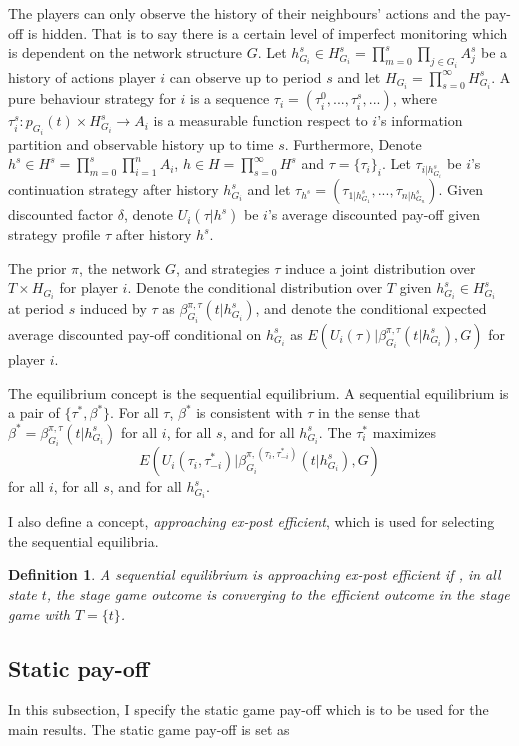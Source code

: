 \documentclass[12pt,letter]{article}
\newtheorem{definition}{Definition}[section]
\theoremstyle{remark}
\theoremstyle{remark}
\theoremstyle{claim}
\begin{document}
The players can only observe the history of their neighbours' actions and the pay-off is hidden. That is to say there is a certain level of imperfect monitoring which is dependent on the network structure $G$. Let $h^s_{G_i}\in H^s_{G_i}=\prod^s_{m=0}\prod_{j\in G_i}A^s_j$ be a history of actions player $i$ can observe up to period $s$ and let $H_{G_i}=\prod^{\infty}_{s=0}H^s_{G_i}$. A pure behaviour strategy for $i$ is a sequence $\tau_i=(\tau^0_i,...,\tau^s_i,...)$, where $\tau^s_i: p_{G_i}(t)\times H^s_{G_i}\rightarrow A_i$ is a measurable function respect to $i$'s information partition and observable history up to time $s$.  Furthermore, Denote $h^s\in H^s=\prod^s_{m=0}\prod^n_{i=1}A_i$, $h\in H=\prod^{\infty}_{s=0}H^s$ and $\tau=\{\tau_i\}_i$.  Let $\tau_{i|h^s_{G_i}}$ be $i$'s continuation strategy after history $h^s_{G_i}$ and let $\tau_{h^s}=(\tau_{1|h^s_{G_1}},...,\tau_{n|h^s_{G_n}})$. Given discounted factor $\delta$, denote $U_i(\tau|{h^s})$ be $i$'s average discounted pay-off given strategy profile $\tau$ after history $h^s$.

The prior $\pi$, the network $G$, and strategies $\tau$ induce a joint distribution over $T\times H_{G_i}$ for player $i$. Denote the conditional distribution over $T$ given $h^{s}_{G_i}\in H^s_{G_i}$ at period $s$ induced by $\tau$ as $\beta^{\pi,\tau}_{G_i}(t|h^{s}_{G_i})$, and denote the conditional expected average discounted pay-off conditional on $h^{s}_{G_i}$ as $E(U_i(\tau)|\beta^{\pi,\tau}_{G_i}(t|h^{s}_{G_i}), G)$ for player $i$. 

The equilibrium concept is the sequential equilibrium. A sequential equilibrium is a pair of $\{\tau^{*}, \beta^{*}\}$. For all $\tau$, $\beta^{*}$ is consistent with $\tau$ in the sense that $\beta^{*}=\beta^{\pi,\tau}_{G_i}(t|h^{s}_{G_i})$ for all $i$, for all $s$, and for all $h^{s}_{G_i}$. The $\tau^{*}_i$ maximizes 
\[E(U_i(\tau_i,\tau^{*}_{-i})|\beta^{\pi,(\tau_i,\tau^{*}_{-i})}_{G_i}(t|h^{s}_{G_i}), G)\] for all $i$, for all $s$, and for all $h^{s}_{G_i}$.

I also define a concept, \textit{approaching ex-post efficient}, which is used for selecting the sequential equilibria.

\begin{definition}
A sequential equilibrium is approaching ex-post efficient if , in all state $t$, the stage game outcome is converging to the efficient outcome in the stage game with $T=\{t\}$.   
\end{definition}

\subsection{Static pay-off}
\label{sec:payoff}
In this subsection, I specify the static game pay-off which is to be used for the main results. The static game pay-off is set as\\
\end{document}
